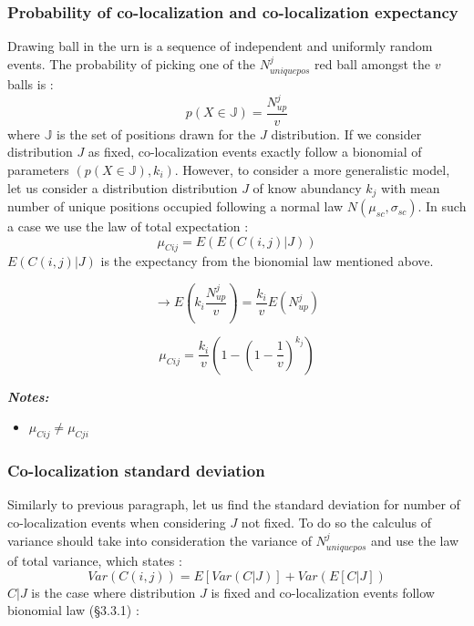 \documentclass{article}
\begin{document}
\subsubsection{Probability of co-localization and co-localization expectancy}
Drawing ball in the urn is a sequence of independent and uniformly random events. The probability of picking one of the $N^j_{uniquepos}$ red ball amongst the $v$
balls is :
\[
p(X\in \mathbb{J}) = \frac{N^j_{up}}{v}
\] 
where $\mathbb{J}$  is the set of positions drawn for the $J$ distribution.
If we consider distribution $J$ as fixed, co-localization events exactly follow a bionomial of parameters $(p(X\in\mathbb{J}),k_i)$. However, to consider a
more generalistic model, let us consider a distribution distribution $J$ of know abundancy $k_j$ with mean number of unique positions occupied following a
normal law $N(\mu_{sc}, \sigma_{sc})$. In such a case we use the law of total expectation :
\[
\mu_{Cij} = E(E(C(i,j) | J))
\]
$E(C(i,j) | J)$ is the expectancy from the bionomial law mentioned above.

\[
\rightarrow E(k_i\frac{N^j_{up}}{v}) = \frac{k_i}{v}E(N^j_{up})
\]

\begin{equation}
    \mu_{Cij} = \frac{k_i}{v}(1-(1-\frac{1}{v})^{k_j})
\end{equation}

\textit{\textbf{Notes:}}
\begin{itemize}
    \item $\mu_{Cij} \neq \mu_{Cji}$
\end{itemize}

\subsubsection{Co-localization standard deviation}

Similarly to previous paragraph, let us find the standard deviation for number of co-localization events when considering $J$ not fixed. 
To do so the calculus of variance should take into consideration the variance of $N^j_{uniquepos}$ and use the law of total variance,
which states :
\[
Var(C(i,j)) = E[Var(C|J)] + Var(E[C|J])
\] 
$C|J$ is the case where distribution $J$ is fixed and co-localization events follow bionomial law (\S3.3.1) :
\end{document}
